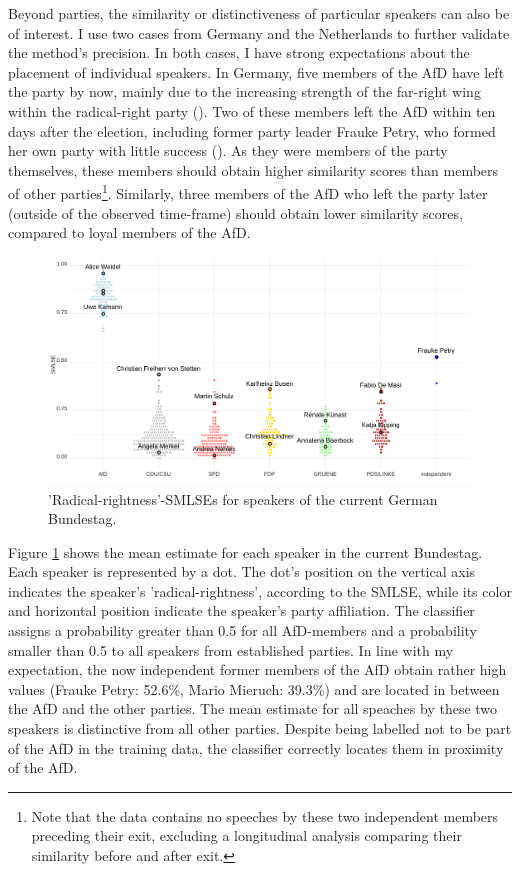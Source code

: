 \documentclass{article}
\begin{document}
Beyond parties, the similarity or distinctiveness of particular speakers can also be of interest. I use two cases from Germany and the Netherlands to further validate the method's precision. In both cases, I have strong expectations about the placement of individual speakers. In Germany, five members of the AfD have left the party by now, mainly due to the increasing strength of the far-right wing within the radical-right party (\cite{Steffen2020AfD}). Two of these members left the AfD within ten days after the election, including former party leader Frauke Petry, who formed her own party  with little success (\cite{LSE2018AfD}). As they were members of the party themselves, these members should obtain higher similarity scores than members of other parties\footnote{Note that the data contains no speeches by these two independent members preceding their exit, excluding a longitudinal analysis comparing their similarity before and after exit.}. Similarly, three members of the AfD who left the party later (outside of the observed time-frame) should obtain lower similarity scores, compared to loyal members of the AfD. \par

\begin{figure}
    \centering
    \includegraphics[width=19cm]{DE/vis/DE_speakers.png}
    \caption{'Radical-rightness'-SMLSEs for speakers of the current German Bundestag.}
    \label{fig:speakers}
\end{figure}

Figure \ref{fig:speakers} shows the mean estimate for each speaker in the current Bundestag. Each speaker is represented by a dot. The dot's position on the vertical axis indicates the speaker's 'radical-rightness', according to the SMLSE, while its color and horizontal position indicate the speaker's party affiliation. The classifier assigns a probability greater than 0.5 for all AfD-members and a probability smaller than 0.5 to all speakers from established parties. In line with my expectation, the now independent former members of the AfD obtain rather high values (Frauke Petry: 52.6\%, Mario Mieruch: 39.3\%) and are located in between the AfD and the other parties. The mean estimate for all speaches by these two speakers is distinctive from all other parties. Despite being labelled not to be part of the AfD in the training data, the classifier correctly locates them in proximity of the AfD. \par
\end{document}
